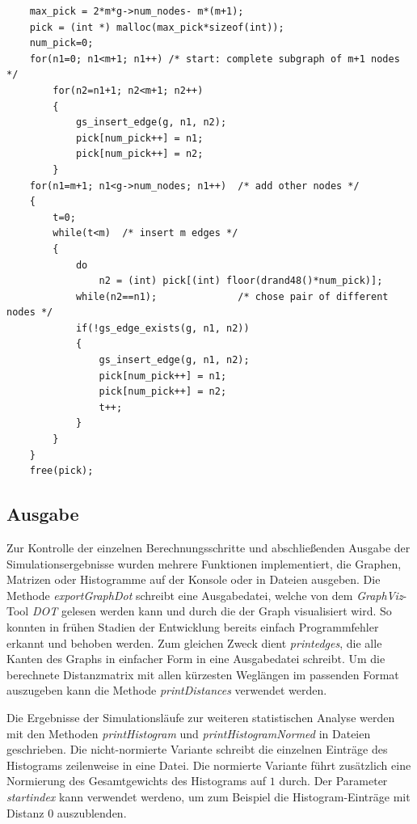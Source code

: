 \documentclass[10pt]{article}
\begin{document}
\begin{lstlisting}
    max_pick = 2*m*g->num_nodes- m*(m+1);
    pick = (int *) malloc(max_pick*sizeof(int));
    num_pick=0;
    for(n1=0; n1<m+1; n1++) /* start: complete subgraph of m+1 nodes */
        for(n2=n1+1; n2<m+1; n2++)
        {
            gs_insert_edge(g, n1, n2);
            pick[num_pick++] = n1;
            pick[num_pick++] = n2;
        }
    for(n1=m+1; n1<g->num_nodes; n1++)  /* add other nodes */
    {
        t=0;
        while(t<m)  /* insert m edges */
        {
            do
                n2 = (int) pick[(int) floor(drand48()*num_pick)];
            while(n2==n1);              /* chose pair of different nodes */
            if(!gs_edge_exists(g, n1, n2))
            {
                gs_insert_edge(g, n1, n2);
                pick[num_pick++] = n1;
                pick[num_pick++] = n2;
                t++;
            }
        }
    }
    free(pick);
\end{lstlisting}

\subsection{Ausgabe}
Zur Kontrolle der einzelnen Berechnungsschritte und abschließenden Ausgabe der Simulationsergebnisse wurden mehrere Funktionen implementiert, die Graphen, Matrizen oder Histogramme auf der Konsole oder in Dateien ausgeben. Die Methode \textit{exportGraphDot} schreibt eine Ausgabedatei, welche von dem \textit{GraphViz}-Tool \textit{DOT} gelesen werden kann und durch die der Graph visualisiert wird. So konnten in frühen Stadien der Entwicklung bereits einfach Programmfehler erkannt und behoben werden. Zum gleichen Zweck dient \textit{printedges}, die alle Kanten des Graphs in einfacher Form in eine Ausgabedatei schreibt. Um die berechnete Distanzmatrix mit allen kürzesten Weglängen im passenden Format auszugeben kann die Methode \textit{printDistances} verwendet werden.

Die Ergebnisse der Simulationsläufe zur weiteren statistischen Analyse werden mit den Methoden \textit{printHistogram} und \textit{printHistogramNormed} in Dateien geschrieben. Die nicht-normierte Variante schreibt die einzelnen Einträge des Histograms zeilenweise in eine Datei. Die normierte Variante führt zusätzlich eine Normierung des Gesamtgewichts des Histograms auf $1$ durch. Der Parameter \textit{startindex} kann verwendet werdeno, um zum Beispiel die Histogram-Einträge mit Distanz 0 auszublenden.
\end{document}
